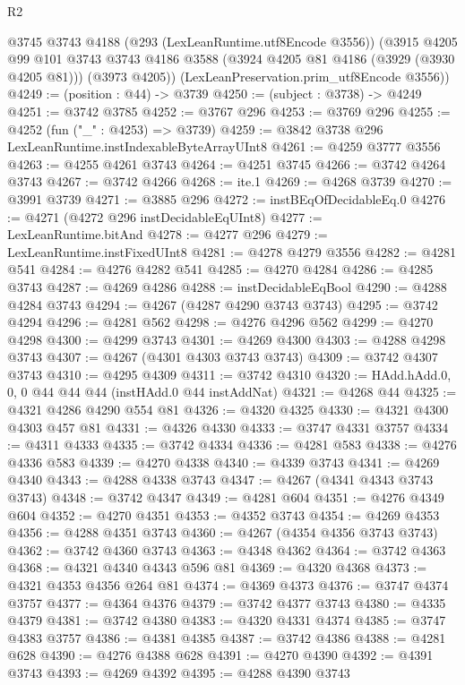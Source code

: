 \begin{lexlean}{R2}
\begin{coremodule}
      @3745
      @3743
      @4188
      (@293 (LexLeanRuntime.utf8Encode @3556))
      (@3915
        @4205
        @99
        @101
        @3743
        @3743
        @4186
        @3588
        (@3924 @4205 @81 @4186 (@3929 (@3930 @4205 @81)))
        (@3973 @4205))
      (LexLeanPreservation.prim_utf8Encode @3556))
@4249 := (position : @44) -> @3739
@4250 := (subject : @3738) -> @4249
@4251 := @3742 @3785
@4252 := @3767 @296
@4253 := @3769 @296
@4255 := @4252 (fun ("_" : @4253) => @3739)
@4259 := @3842 @3738 @296 LexLeanRuntime.instIndexableByteArrayUInt8
@4261 := @4259 @3777 @3556
@4263 := @4255 @4261 @3743
@4264 := @4251 @3745
@4266 := @3742 @4264 @3743
@4267 := @3742 @4266
@4268 := ite.{1}
@4269 := @4268 @3739
@4270 := @3991 @3739
@4271 := @3885 @296
@4272 := instBEqOfDecidableEq.{0}
@4276 := @4271 (@4272 @296 instDecidableEqUInt8)
@4277 := LexLeanRuntime.bitAnd
@4278 := @4277 @296
@4279 := LexLeanRuntime.instFixedUInt8
@4281 := @4278 @4279 @3556
@4282 := @4281 @541
@4284 := @4276 @4282 @541
@4285 := @4270 @4284
@4286 := @4285 @3743
@4287 := @4269 @4286
@4288 := instDecidableEqBool
@4290 := @4288 @4284 @3743
@4294 := @4267 (@4287 @4290 @3743 @3743)
@4295 := @3742 @4294
@4296 := @4281 @562
@4298 := @4276 @4296 @562
@4299 := @4270 @4298
@4300 := @4299 @3743
@4301 := @4269 @4300
@4303 := @4288 @4298 @3743
@4307 := @4267 (@4301 @4303 @3743 @3743)
@4309 := @3742 @4307 @3743
@4310 := @4295 @4309
@4311 := @3742 @4310
@4320 := HAdd.hAdd.{0, 0, 0} @44 @44 @44 (instHAdd.{0} @44 instAddNat)
@4321 := @4268 @44
@4325 := @4321 @4286 @4290 @554 @81
@4326 := @4320 @4325
@4330 := @4321 @4300 @4303 @457 @81
@4331 := @4326 @4330
@4333 := @3747 @4331 @3757
@4334 := @4311 @4333
@4335 := @3742 @4334
@4336 := @4281 @583
@4338 := @4276 @4336 @583
@4339 := @4270 @4338
@4340 := @4339 @3743
@4341 := @4269 @4340
@4343 := @4288 @4338 @3743
@4347 := @4267 (@4341 @4343 @3743 @3743)
@4348 := @3742 @4347
@4349 := @4281 @604
@4351 := @4276 @4349 @604
@4352 := @4270 @4351
@4353 := @4352 @3743
@4354 := @4269 @4353
@4356 := @4288 @4351 @3743
@4360 := @4267 (@4354 @4356 @3743 @3743)
@4362 := @3742 @4360 @3743
@4363 := @4348 @4362
@4364 := @3742 @4363
@4368 := @4321 @4340 @4343 @596 @81
@4369 := @4320 @4368
@4373 := @4321 @4353 @4356 @264 @81
@4374 := @4369 @4373
@4376 := @3747 @4374 @3757
@4377 := @4364 @4376
@4379 := @3742 @4377 @3743
@4380 := @4335 @4379
@4381 := @3742 @4380
@4383 := @4320 @4331 @4374
@4385 := @3747 @4383 @3757
@4386 := @4381 @4385
@4387 := @3742 @4386
@4388 := @4281 @628
@4390 := @4276 @4388 @628
@4391 := @4270 @4390
@4392 := @4391 @3743
@4393 := @4269 @4392
@4395 := @4288 @4390 @3743

\end{coremodule}
\end{lexlean}

